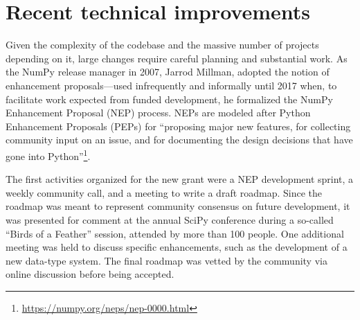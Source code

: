 \section{Recent technical improvements}

Given the complexity of the codebase and the massive number of projects depending
on it, large changes require careful planning and substantial work.
As the NumPy release manager in 2007, Jarrod Millman, adopted the notion
of enhancement proposals---used infrequently and informally until 2017 when,
to facilitate work expected from funded development, he formalized the
NumPy Enhancement Proposal (NEP) process.  NEPs are modeled after
Python Enhancement Proposals (PEPs) for ``proposing major new
features, for collecting community input on an issue, and for
documenting the design decisions that have gone into
Python''\footnote{\url{https://numpy.org/neps/nep-0000.html}}.

The first activities organized for the new grant were a NEP development
sprint, a weekly community call, and a meeting to write a draft roadmap.
Since the roadmap was meant to represent community consensus on future
development, it was presented for comment at the annual SciPy
conference during a so-called ``Birds of a Feather'' session, attended
by more than 100 people.  One additional meeting was held to discuss
specific enhancements, such as the development of a new data-type
system.  The final roadmap was vetted by the community via online
discussion before being accepted.



